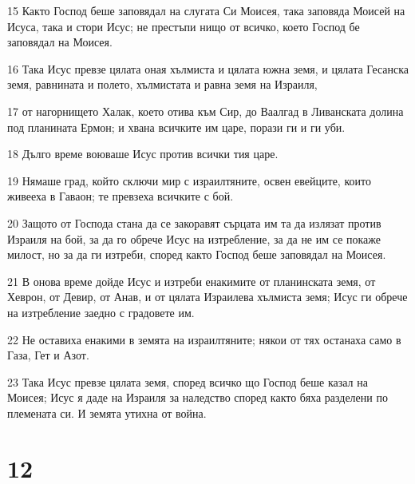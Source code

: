 \par 15 Както Господ беше заповядал на слугата Си Моисея, така заповяда Моисей на Исуса, така и стори Исус; не престъпи нищо от всичко, което Господ бе заповядал на Моисея.
\par 16 Така Исус превзе цялата оная хълмиста и цялата южна земя, и цялата Гесанска земя, равнината и полето, хълмистата и равна земя на Израиля,
\par 17 от нагорнището Халак, което отива към Сир, до Ваалгад в Ливанската долина под планината Ермон; и хвана всичките им царе, порази ги и ги уби.
\par 18 Дълго време воюваше Исус против всички тия царе.
\par 19 Нямаше град, който сключи мир с израилтяните, освен евейците, които живееха в Гаваон; те превзеха всичките с бой.
\par 20 Защото от Господа стана да се закоравят сърцата им та да излязат против Израиля на бой, за да го обрече Исус на изтребление, за да не им се покаже милост, но за да ги изтреби, според както Господ беше заповядал на Моисея.
\par 21 В онова време дойде Исус и изтреби енакимите от планинската земя, от Хеврон, от Девир, от Анав, и от цялата Израилева хълмиста земя; Исус ги обрече на изтребление заедно с градовете им.
\par 22 Не оставиха енакими в земята на израилтяните; някои от тях останаха само в Газа, Гет и Азот.
\par 23 Така Исус превзе цялата земя, според всичко що Господ беше казал на Моисея; Исус я даде на Израиля за наледство според както бяха разделени по племената си. И земята утихна от война.

\chapter{12}

